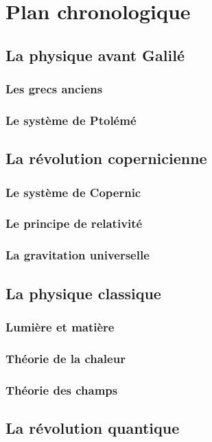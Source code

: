 \chapter{Plan chronologique}

\section{La physique avant Galilé}
  \subsection{Les grecs anciens}
  \subsection{Le système de Ptolémé}

\section{La révolution copernicienne}
  \subsection{Le système de Copernic}
  \subsection{Le principe de relativité}
  \subsection{La gravitation universelle}

\section{La physique classique}
  \subsection{Lumière et matière}
  \subsection{Théorie de la chaleur}
  \subsection{Théorie des champs}

\section{La révolution quantique}
